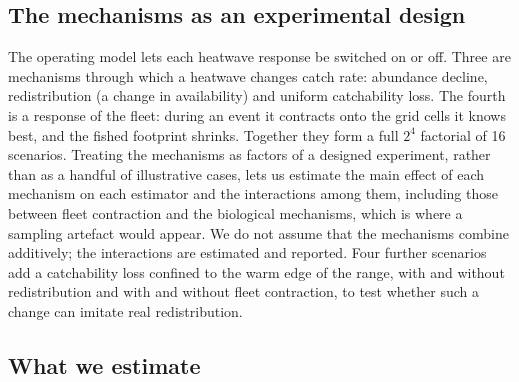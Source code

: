 \documentclass[11pt,a4paper]{article}
\begin{document}
\subsection{The mechanisms as an experimental design}
\label{sec:design}

The operating model lets each heatwave response be switched on or off. Three are mechanisms through which a heatwave changes catch rate: abundance decline, redistribution (a change in availability) and uniform catchability loss. The fourth is a response of the fleet: during an event it contracts onto the grid cells it knows best, and the fished footprint shrinks. Together they form a full $2^4$ factorial of 16 scenarios. Treating the mechanisms as factors of a designed experiment, rather than as a handful of illustrative cases, lets us estimate the main effect of each mechanism on each estimator and the interactions among them, including those between fleet contraction and the biological mechanisms, which is where a sampling artefact would appear. We do not assume that the mechanisms combine additively; the interactions are estimated and reported. Four further scenarios add a catchability loss confined to the warm edge of the range, with and without redistribution and with and without fleet contraction, to test whether such a change can imitate real redistribution.

\subsection{What we estimate}
\label{sec:targets}
\end{document}
